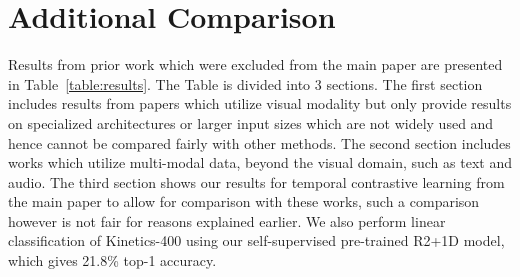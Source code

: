 \documentclass[10pt,twocolumn,letterpaper]{article}
\begin{document}
\section{Additional Comparison} 
\label{sec:additional_comparison}

Results from prior work which were excluded from the main paper are presented in Table~\ref{table:results}. The Table is divided into 3 sections. The first section includes results from papers which utilize visual modality but only provide results on specialized architectures or larger input sizes which are not widely used and hence cannot be compared fairly with other methods.  The second section includes works which utilize multi-modal data, beyond the visual domain, such as text and audio. The third section shows our results for temporal contrastive learning from the main paper to allow for comparison with these works, such a comparison however is not fair for reasons explained earlier. We also perform linear classification of Kinetics-400 using our self-supervised pre-trained R2+1D model, which gives 21.8\% top-1 accuracy. 
\end{document}
